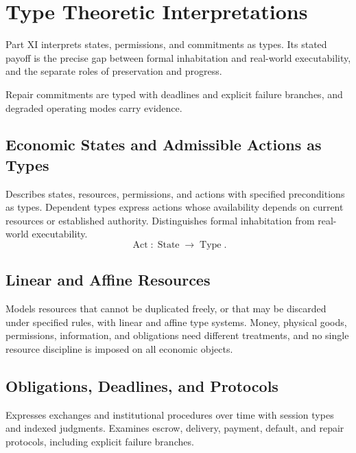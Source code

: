 \part{Type Theoretic Interpretations}
\label{part:XI}

Part XI interprets states, permissions, and commitments as types. Its stated payoff is the precise gap between formal inhabitation and real-world executability, and the separate roles of preservation and progress.

\begin{housing}Repair commitments are typed with deadlines and explicit failure branches, and degraded operating modes carry evidence.\end{housing}

\chapter{Economic States and Admissible Actions as Types}\label{ch:51}
Describes states, resources, permissions, and actions with specified preconditions as types. Dependent types express actions whose availability depends on current resources or established authority. Distinguishes formal inhabitation from real-world executability.
\[
\operatorname{Act}:\operatorname{State}\rightarrow\operatorname{Type}.
\]
\scaffold

\chapter{Linear and Affine Resources}\label{ch:52}
Models resources that cannot be duplicated freely, or that may be discarded under specified rules, with linear and affine type systems. Money, physical goods, permissions, information, and obligations need different treatments, and no single resource discipline is imposed on all economic objects.
\scaffold

\chapter{Obligations, Deadlines, and Protocols}\label{ch:53}
Expresses exchanges and institutional procedures over time with session types and indexed judgments. Examines escrow, delivery, payment, default, and repair protocols, including explicit failure branches.
\scaffold


